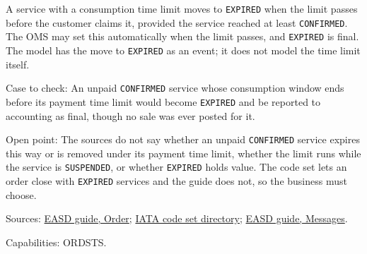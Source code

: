 \begin{definition}
  \label{def:delivery-expired-unclaimed}
  A service with a consumption time limit moves to \texttt{EXPIRED} when the
  limit passes before the customer claims it, provided the service reached
  at least \texttt{CONFIRMED}. The OMS may set this automatically when the
  limit passes, and \texttt{EXPIRED} is final.  The model has the move to
  \texttt{EXPIRED} as an event; it does not model the time limit itself.

  Case to check: An unpaid \texttt{CONFIRMED} service whose consumption
  window ends before its payment time limit would become \texttt{EXPIRED}
  and be reported to accounting as final, though no sale was ever posted for
  it.

  Open point: The sources do not say whether an unpaid \texttt{CONFIRMED}
  service expires this way or is removed under its payment time limit,
  whether the limit runs while the service is \texttt{SUSPENDED}, or whether
  \texttt{EXPIRED} holds value. The code set lets an order close with
  \texttt{EXPIRED} services and the guide does not, so the business must
  choose.

  Sources: \href{https://standards.atlassian.net/wiki/spaces/EASD/pages/574849062/Order}{EASD guide, Order};
  \href{https://standards.atlassian.net/wiki/spaces/AIDM/pages/607420437/View+IATA+Codeset+Directory}{IATA code set directory};
  \href{https://standards.atlassian.net/wiki/spaces/EASD/pages/574652427/Messages}{EASD guide, Messages}.

  Capabilities: ORDSTS.
\end{definition}


